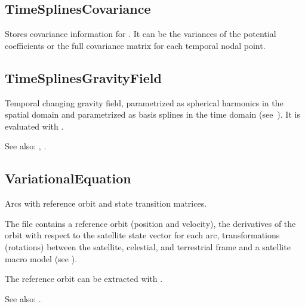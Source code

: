 \subsection{TimeSplinesCovariance}\label{general.fileFormat:timeSplinesCovariance}
Stores covariance information for .
It can be the variances of the potential coefficients or the full covariance matrix for each
temporal nodal point.


\subsection{TimeSplinesGravityField}\label{general.fileFormat:timeSplinesGravityField}
Temporal changing gravity field, parametrized as spherical harmonics in the spatial domain and
parametrized as basis splines in the time domain (see~).
It is evaluated with .

See also: , .


\subsection{VariationalEquation}\label{general.fileFormat:variationalEquation}
Arcs with reference orbit and state transition matrices.

The file contains a reference orbit (position and velocity),
the derivatives of the orbit with respect to the satellite state vector for each arc,
transformations (rotations) between the satellite, celestial, and terrestrial frame
and a satellite macro model (see ).

The reference orbit can be extracted with .

See also: .



